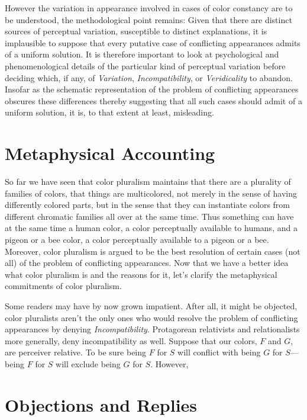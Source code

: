 \documentclass[12pt]{article}
\begin{document}
However the variation in appearance involved in cases of color constancy are to be understood, the methodological point remains: Given that there are distinct sources of perceptual variation, susceptible to distinct explanations, it is implausible to suppose that every putative case of conflicting appearances admits of a uniform solution. It is therefore important to look at psychological and phenomenological details of the particular kind of perceptual variation before deciding which, if any, of \emph{Variation}, \emph{Incompatibility}, or \emph{Veridicality} to abandon. Insofar as the schematic representation of the problem of conflicting appearances obscures these differences thereby suggesting that all such cases should admit of a uniform solution, it is, to that extent at least, misleading.


\section{Metaphysical Accounting} %
\label{sec:metaphysical_accounting}

So far we have seen that color pluralism maintains that there are a plurality of families of colors, that things are multicolored, not merely in the sense of having differently colored parts, but in the sense that they can instantiate colors from different chromatic families all over at the same time. Thus something can have at the same time a human color, a color perceptually available to humans, and a pigeon or a bee color, a color perceptually available to a pigeon or a bee. Moreover, color pluralism is argued to be the best resolution of certain cases (not all) of the problem of conflicting appearances. Now that we have a better idea what color pluralism is and the reasons for it, let's clarify the metaphysical commitments of color pluralism.

Some readers may have by now grown impatient. After all, it might be objected, color pluralists aren't the only ones who would resolve the problem of conflicting appearances by denying \emph{Incompatibility}. Protagorean relativists and relationalists more generally, deny incompatibility as well. Suppose that our colors, \( F \) and \( G \), are perceiver relative. To be sure being \( F \) for \( S \) will conflict with being \( G \) for \( S \)---being \( F \) for \( S \) will exclude being \( G \) for \( S \). However, 


\section{Objections and Replies} %
\label{sec:objections_and_replies}



\nocite{Cooper:1997fk}
\nocite{Hett:1936fk}

 
 
\end{document}
